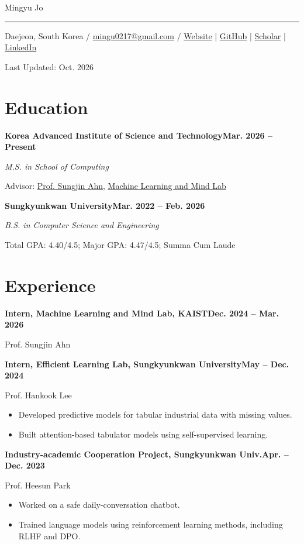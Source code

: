 \documentclass[10pt,a4paper]{article}
\begin{document}
\begin{center}
{\LARGE Mingyu Jo}\par
\vspace{2pt}\hrule\vspace{2pt}
Daejeon, South Korea / \href{mailto:mingu0217@gmail.com}{mingu0217@gmail.com} /
\href{https://jojo0217.github.io}{Website} \enspace|\enspace
\href{https://github.com/JoJo0217}{GitHub} \enspace|\enspace
\href{https://scholar.google.com/citations?user=TgVXif0AAAAJ}{Scholar} \enspace|\enspace
\href{https://www.linkedin.com/in/pyross}{LinkedIn}\par
Last Updated: Oct. 2026
\end{center}

\section*{Education}
\textbf{Korea Advanced Institute of Science and Technology}\hfill \textbf{Mar. 2026 -- Present}\par
\textit{M.S. in School of Computing}\par
Advisor: \href{https://mlml.kaist.ac.kr/sungjinahn}{Prof. Sungjin Ahn},
\href{https://mlml.kaist.ac.kr/}{Machine Learning and Mind Lab}

\medskip
\textbf{Sungkyunkwan University}\hfill \textbf{Mar. 2022 -- Feb. 2026}\par
\textit{B.S. in Computer Science and Engineering}\par
Total GPA: 4.40/4.5; Major GPA: 4.47/4.5; Summa Cum Laude

\section*{Experience}
\textbf{Intern, Machine Learning and Mind Lab, KAIST}\hfill \textbf{Dec. 2024 -- Mar. 2026}\par
Prof. Sungjin Ahn

\medskip
\textbf{Intern, Efficient Learning Lab, Sungkyunkwan University}\hfill \textbf{May -- Dec. 2024}\par
Prof. Hankook Lee
\begin{itemize}
  \item Developed predictive models for tabular industrial data with missing values.
  \item Built attention-based tabulator models using self-supervised learning.
\end{itemize}

\medskip
\textbf{Industry-academic Cooperation Project, Sungkyunkwan Univ.}\hfill \textbf{Apr. -- Dec. 2023}\par
Prof. Heesun Park
\begin{itemize}
  \item Worked on a safe daily-conversation chatbot.
  \item Trained language models using reinforcement learning methods, including RLHF and DPO.
\end{itemize}
\end{document}
